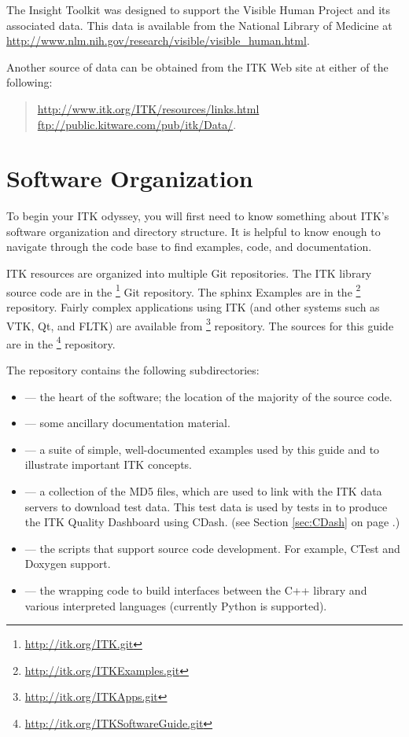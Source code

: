 The Insight Toolkit was designed to support the Visible Human Project
and its associated data. This data is available from the National Library of
Medicine at \url{http://www.nlm.nih.gov/research/visible/visible_human.html}.

Another source of data can be obtained from the ITK Web site at either
of the following:
\begin{quote}
\url{http://www.itk.org/ITK/resources/links.html} \\
\url{ftp://public.kitware.com/pub/itk/Data/}.
\end{quote}

\section{Software Organization}
\label{sec:SoftwareOrganization}

To begin your ITK odyssey, you will first need to know something about
ITK's software organization and directory structure. It is helpful to
know enough to navigate through the code base to find examples, code,
and documentation.

ITK resources are organized into multiple Git repositories. The ITK library source
code are in the \footnote{\url{http://itk.org/ITK.git}} Git
repository. The sphinx Examples are in the
\footnote{\url{http://itk.org/ITKExamples.git}} repository.
Fairly complex applications using ITK (and other systems such as VTK, Qt, and
FLTK) are available from
\footnote{\url{http://itk.org/ITKApps.git}}
repository.  The sources for this guide are in the
\footnote{\url{http://itk.org/ITKSoftwareGuide.git}}
repository.

The  repository contains the following subdirectories:
\begin{itemize}
        \item {} --- the heart of the software; the location
        of the majority of the source code.
        \item {} --- some ancillary documentation
        material.
        \item {} --- a suite of simple, well-documented
        examples used by this guide and to illustrate important
        ITK concepts.
        \item {} --- a collection of the MD5 files, which are
used to link with the ITK data servers to download test data. This test data is
used by tests in  to produce the ITK Quality Dashboard using
CDash.
        (see Section \ref{sec:CDash} on page \pageref{sec:CDash}.)
        \item {} --- the scripts that support source code development. For example, CTest and Doxygen support.
        \item {} --- the wrapping code to build interfaces between the C++ library and various interpreted languages (currently Python is supported).
\end{itemize}

